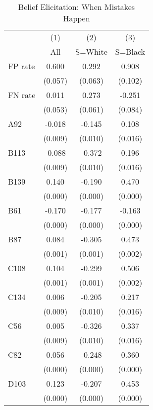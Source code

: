 \begin{table}[htbp]\centering
\caption{Belief Elicitation: When Mistakes Happen}
\begin{tabular}{l*{3}{c}}
\hline\hline
                &\multicolumn{1}{c}{(1)}&\multicolumn{1}{c}{(2)}&\multicolumn{1}{c}{(3)}\\
                &\multicolumn{1}{c}{All}&\multicolumn{1}{c}{S=White}&\multicolumn{1}{c}{S=Black}\\
\hline
FP rate         &    0.600&    0.292&    0.908\\
                &  (0.057)&  (0.063)&  (0.102)\\
FN rate         &    0.011&    0.273&   -0.251\\
                &  (0.053)&  (0.061)&  (0.084)\\
A92             &   -0.018&   -0.145&    0.108\\
                &  (0.009)&  (0.010)&  (0.016)\\
B113            &   -0.088&   -0.372&    0.196\\
                &  (0.009)&  (0.010)&  (0.016)\\
B139            &    0.140&   -0.190&    0.470\\
                &  (0.000)&  (0.000)&  (0.000)\\
B61             &   -0.170&   -0.177&   -0.163\\
                &  (0.000)&  (0.000)&  (0.000)\\
B87             &    0.084&   -0.305&    0.473\\
                &  (0.001)&  (0.001)&  (0.002)\\
C108            &    0.104&   -0.299&    0.506\\
                &  (0.001)&  (0.001)&  (0.002)\\
C134            &    0.006&   -0.205&    0.217\\
                &  (0.009)&  (0.010)&  (0.016)\\
C56             &    0.005&   -0.326&    0.337\\
                &  (0.009)&  (0.010)&  (0.016)\\
C82             &    0.056&   -0.248&    0.360\\
                &  (0.000)&  (0.000)&  (0.000)\\
D103            &    0.123&   -0.207&    0.453\\
                &  (0.000)&  (0.000)&  (0.000)\\

\end{tabular}
\end{table}
